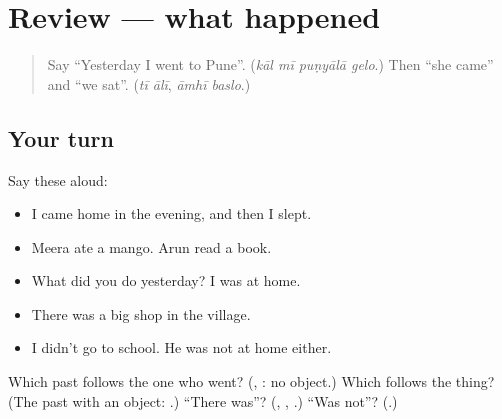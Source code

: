 \section[(review)]{Review — what happened}

\label{lesson:MR-R276-what-happened}



\begin{quote}
Say \textquotedblleft{}Yesterday I went to Pune\textquotedblright{}. (\emph{kāl mī puṇyālā gelo}.) Then \textquotedblleft{}she came\textquotedblright{} and \textquotedblleft{}we sat\textquotedblright{}. (\emph{tī ālī}, \emph{āmhī baslo}.)
\end{quote}

\subsection*{Your turn}
Say these aloud:

\begin{itemize}
\raggedright
  \item I came home in the evening, and then I slept.
  \item Meera ate a mango. Arun read a book.
  \item What did you do yesterday? I was at home.
  \item There was a big shop in the village.
  \item I didn't go to school. He was not at home either.
\end{itemize}

\begin{tcolorbox}[breakable,colback=teal!4,colframe=teal!35!black,title={Before you move on}]
Which past follows the one who went? (\textbf{}, \textbf{}: no object.) Which follows the thing? (The past with an object: \textbf{  }.) \textquotedblleft{}There was\textquotedblright{}? (\textbf{}, \textbf{}, \textbf{}.) \textquotedblleft{}Was not\textquotedblright{}? (\textbf{}.)
\end{tcolorbox}
